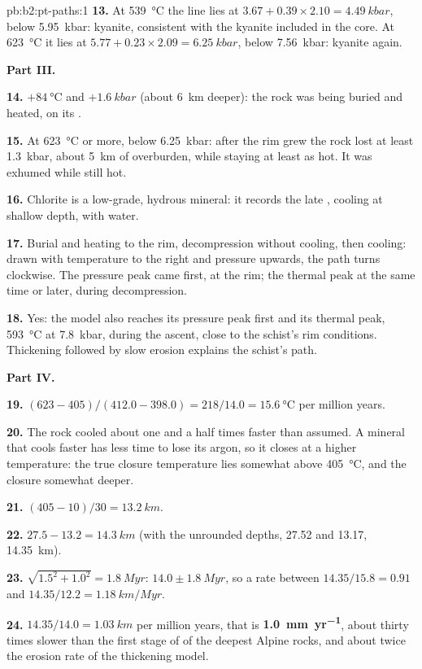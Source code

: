 \begin{solution}{pb:b2:pt-paths:1}
\textbf{13.} At \qty{539}{\celsius} the line lies at $3.67 + 0.39\times2.10 =
\qty{4.49}{kbar}$, below \qty{5.95}{kbar}: kyanite, consistent with the kyanite included
in the core. At \qty{623}{\celsius} it lies at $5.77 + 0.23\times2.09 = \qty{6.25}{kbar}$,
below \qty{7.56}{kbar}: kyanite again.

\noindent\textbf{Part III.}

\textbf{14.} $+\qty{84}{\celsius}$ and $+\qty{1.6}{kbar}$ (about \qty{6}{km} deeper): the
rock was being buried and heated, on its .

\textbf{15.} At \qty{623}{\celsius} or more, below \qty{6.25}{kbar}: after the rim grew the
rock lost at least \qty{1.3}{kbar}, about \qty{5}{km} of overburden, while staying at
least as hot. It was exhumed while still hot.

\textbf{16.} Chlorite is a low-grade, hydrous mineral: it records the late , cooling at shallow depth, with water.

\textbf{17.} Burial and heating to the rim, decompression without cooling, then cooling:
drawn with temperature to the right and pressure upwards, the path turns clockwise. The
pressure peak came first, at the rim; the thermal peak at the same time or later, during
decompression.

\textbf{18.} Yes: the model also reaches its pressure peak first and its thermal peak,
\qty{593}{\celsius} at \qty{7.8}{kbar}, during the ascent, close to the schist's rim
conditions. Thickening followed by slow erosion explains the schist's path.

\noindent\textbf{Part IV.}

\textbf{19.} $(623 - 405)/(412.0 - 398.0) = 218/14.0 = \qty{15.6}{\celsius}$ per million
years.

\textbf{20.} The rock cooled about one and a half times faster than assumed. A mineral
that cools faster has less time to lose its argon, so it closes at a higher temperature:
the true closure temperature lies somewhat above \qty{405}{\celsius}, and the closure
somewhat deeper.

\textbf{21.} $(405 - 10)/30 = \qty{13.2}{km}$.

\textbf{22.} $27.5 - 13.2 = \qty{14.3}{km}$ (with the unrounded depths, 27.52 and 13.17,
\qty{14.35}{km}).

\textbf{23.} $\sqrt{1.5^2 + 1.0^2} = \qty{1.8}{Myr}$: $14.0 \pm \qty{1.8}{Myr}$, so a rate
between $14.35/15.8 = 0.91$ and $14.35/12.2 = \qty{1.18}{km/Myr}$.

\textbf{24.} $14.35/14.0 = \qty{1.03}{km}$ per million years, that is
\textbf{\qty[text-series-to-math=true]{1.0}{mm.yr^{-1}}}, about thirty times slower than
the first stage of  of the deepest Alpine rocks, and about twice the erosion rate
of the thickening model.
\end{solution}

